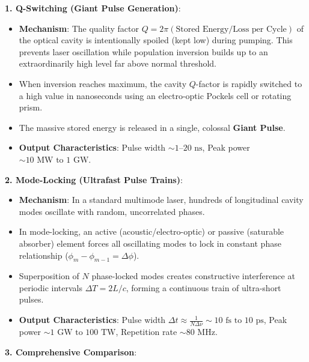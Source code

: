 \begin{theorysol}
\textbf{1. Q-Switching (Giant Pulse Generation)}:
\begin{itemize}
    \item \textbf{Mechanism}: The quality factor $Q = 2\pi(\text{Stored Energy}/\text{Loss per Cycle})$ of the optical cavity is intentionally spoiled (kept low) during pumping. This prevents laser oscillation while population inversion builds up to an extraordinarily high level far above normal threshold.
    \item When inversion reaches maximum, the cavity $Q$-factor is rapidly switched to a high value in nanoseconds using an electro-optic Pockels cell or rotating prism.
    \item The massive stored energy is released in a single, colossal \textbf{Giant Pulse}.
    \item \textbf{Output Characteristics}: Pulse width $\sim 1\text{--}20\text{ ns}$, Peak power $\sim 10\text{ MW to }1\text{ GW}$.
\end{itemize}

\textbf{2. Mode-Locking (Ultrafast Pulse Trains)}:
\begin{itemize}
    \item \textbf{Mechanism}: In a standard multimode laser, hundreds of longitudinal cavity modes oscillate with random, uncorrelated phases.
    \item In mode-locking, an active (acoustic/electro-optic) or passive (saturable absorber) element forces all oscillating modes to lock in constant phase relationship ($\phi_m - \phi_{m-1} = \Delta\phi$).
    \item Superposition of $N$ phase-locked modes creates constructive interference at periodic intervals $\Delta T = 2L/c$, forming a continuous train of ultra-short pulses.
    \item \textbf{Output Characteristics}: Pulse width $\Delta t \approx \frac{1}{N\Delta\nu} \sim 10\text{ fs to }10\text{ ps}$, Peak power $\sim 1\text{ GW to }100\text{ TW}$, Repetition rate $\sim 80\text{ MHz}$.
\end{itemize}

\textbf{3. Comprehensive Comparison}:
\begin{center}
\begin{tabularx}{\linewidth}{|l|X|X|}
\hline


\end{tabularx}
\end{center}
\end{theorysol}
